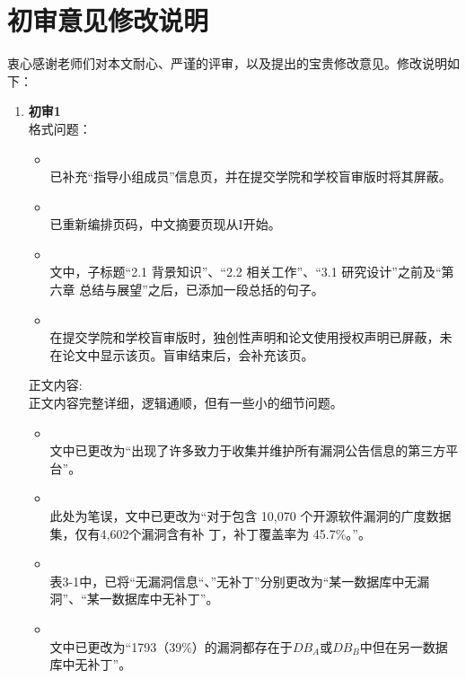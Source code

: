 \chapter{初审意见修改说明}

衷心感谢老师们对本文耐心、严谨的评审，以及提出的宝贵修改意见。修改说明如下：


\begin{enumerate}[]
  \item \textbf{初审1}\\
  格式问题：
  \begin{itemize}
    \item {}\\
      已补充“指导小组成员”信息页，并在提交学院和学校盲审版时将其屏蔽。
    \item {}\\
      已重新编排页码，中文摘要页现从I开始。
    \item {}\\
      文中，子标题“2.1 背景知识”、“2.2 相关工作”、“3.1 研究设计”之前及“第六章 总结与展望”之后，已添加一段总括的句子。
    \item {}\\
      在提交学院和学校盲审版时，独创性声明和论文使用授权声明已屏蔽，未在论文中显示该页。盲审结束后，会补充该页。
  \end{itemize}

  正文内容: \\
  正文内容完整详细，逻辑通顺，但有一些小的细节问题。
  \begin{itemize}[]
      \item {}\\
        文中已更改为“出现了许多致力于收集并维护所有漏洞公告信息的第三方平台”。
      \item {}\\
        此处为笔误，文中已更改为“对于包含 10,070 个开源软件漏洞的广度数据集，仅有4,602个漏洞含有补 丁，补丁覆盖率为 45.7\%。”。
      \item {}\\
        表3-1中，已将“无漏洞信息“、”无补丁”分别更改为“某一数据库中无漏洞”、“某一数据库中无补丁”。
      \item {}\\
        文中已更改为“1793（39\%）的漏洞都存在于$DB_A$或$DB_B$中但在另一数据库中无补丁”。
  \end{itemize}


\end{enumerate}
